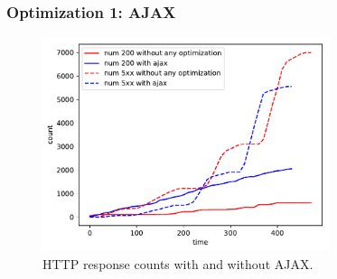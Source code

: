 \begin{frame}
\frametitle{Optimization 1: AJAX}
\begin{figure}[h]
	\centering
	\includegraphics[width=0.75\textwidth]{images/without-any-optimization-with-ajax.pdf}
	\caption{HTTP response counts with and without AJAX.}\label{fig:sqlopt}
\end{figure}
\end{frame}
